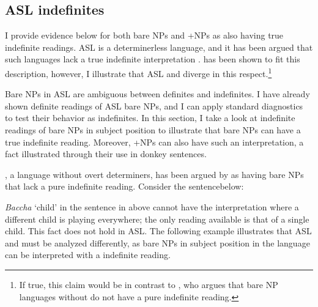 \documentclass[output=paper,
modfonts
]{langscibook}
\begin{document}
\subsection{ASL indefinites}

I provide evidence below for both bare NPs and +NPs as also having true indefinite readings. ASL is a determinerless language, and it has been argued that such languages lack a true indefinite interpretation \citep{Dayal2004}.  has been shown to fit this description, however, I illustrate that ASL and  diverge in this respect.\footnote{ If true, this claim would be in contrast to \citet{Dayal2004}, who argues that bare NP languages without  do not have a pure indefinite reading. }

Bare NPs in ASL are ambiguous between definites and indefinites. I have already shown definite readings of ASL bare NPs, and I can apply standard diagnostics to test their behavior as indefinites. In this section, I take a look at  indefinite readings of bare NPs in subject position to illustrate that bare NPs can have a true indefinite reading. Moreover, +NPs can also have such an interpretation, a fact illustrated through their use in donkey sentences. 

, a language without overt determiners, has been argued by \citet{Dayal2004} as having bare NPs that lack a pure indefinite reading. Consider the sentence\largerpage below:

\begin{exe} 
\end{exe} 

\textit{Baccha} `child' in the sentence in  above cannot have the interpretation where a different child is playing everywhere; the only reading available is that of a single child. This fact does not hold in ASL. The following example illustrates that ASL and  must be analyzed differently, as bare NPs in subject position in the language can be interpreted with a  indefinite reading. 
\end{document}
